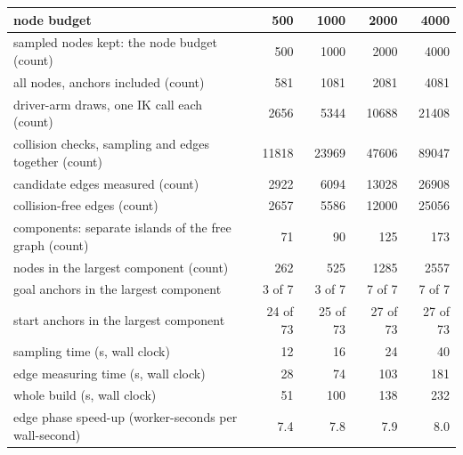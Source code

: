 \begin{tabular}{@{}>{\raggedright\arraybackslash}p{6.8cm} rrrr@{}}
\toprule
node budget & 500 & 1000 & 2000 & 4000 \\
\midrule
sampled nodes kept: the node budget (count) & 500 & 1000 & 2000 & 4000 \\
all nodes, anchors included (count) & 581 & 1081 & 2081 & 4081 \\
driver-arm draws, one IK call each (count) & 2656 & 5344 & 10688 & 21408 \\
collision checks, sampling and edges together (count) & 11818 & 23969 & 47606 & 89047 \\
candidate edges measured (count) & 2922 & 6094 & 13028 & 26908 \\
collision-free edges (count) & 2657 & 5586 & 12000 & 25056 \\
components: separate islands of the free graph (count) & 71 & 90 & 125 & 173 \\
nodes in the largest component (count) & 262 & 525 & 1285 & 2557 \\
goal anchors in the largest component & 3 of 7 & 3 of 7 & 7 of 7 & 7 of 7 \\
start anchors in the largest component & 24 of 73 & 25 of 73 & 27 of 73 & 27 of 73 \\
\midrule
sampling time (s, wall clock) & 12 & 16 & 24 & 40 \\
edge measuring time (s, wall clock) & 28 & 74 & 103 & 181 \\
whole build (s, wall clock) & 51 & 100 & 138 & 232 \\
edge phase speed-up (worker-seconds per wall-second) & 7.4 & 7.8 & 7.9 & 8.0 \\
\bottomrule
\end{tabular}
